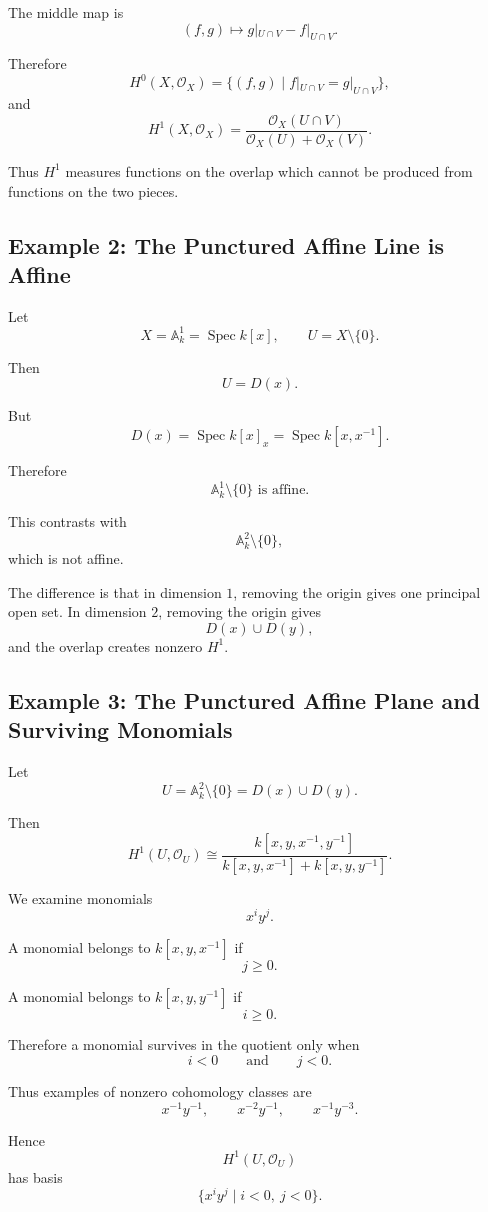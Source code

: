\documentclass[12pt,a4paper]{article}
\theoremstyle{notespace}
\begin{document}
The middle map is
\[
(f,g)
\longmapsto
g|_{U\cap V}-f|_{U\cap V}.
\]

Therefore
\[
H^0(X,\mathcal O_X)
=
\{(f,g)\mid f|_{U\cap V}=g|_{U\cap V}\},
\]
and
\[
H^1(X,\mathcal O_X)
=
\frac{\mathcal O_X(U\cap V)}
{\mathcal O_X(U)+\mathcal O_X(V)}.
\]

Thus $H^1$ measures functions on the overlap which cannot be produced from
functions on the two pieces.

\subsection{Example 2: The Punctured Affine Line is Affine}

Let
\[
X=\mathbb A_k^1=\operatorname{Spec}k[x],
\qquad
U=X\setminus\{0\}.
\]

Then
\[
U=D(x).
\]

But
\[
D(x)=\operatorname{Spec}k[x]_x
=
\operatorname{Spec}k[x,x^{-1}].
\]

Therefore
\[
\boxed{
	\mathbb A_k^1\setminus\{0\}
	\text{ is affine.}
}
\]

This contrasts with
\[
\mathbb A_k^2\setminus\{0\},
\]
which is not affine.

The difference is that in dimension $1$, removing the origin gives one
principal open set. In dimension $2$, removing the origin gives
\[
D(x)\cup D(y),
\]
and the overlap creates nonzero $H^1$.

\subsection{Example 3: The Punctured Affine Plane and Surviving Monomials}

Let
\[
U=\mathbb A_k^2\setminus\{0\}=D(x)\cup D(y).
\]

Then
\[
H^1(U,\mathcal O_U)
\cong
\frac{k[x,y,x^{-1},y^{-1}]}
{k[x,y,x^{-1}]+k[x,y,y^{-1}]}.
\]

We examine monomials
\[
x^iy^j.
\]

A monomial belongs to $k[x,y,x^{-1}]$ if
\[
j\geq0.
\]

A monomial belongs to $k[x,y,y^{-1}]$ if
\[
i\geq0.
\]

Therefore a monomial survives in the quotient only when
\[
i<0
\qquad\text{and}\qquad
j<0.
\]

Thus examples of nonzero cohomology classes are
\[
x^{-1}y^{-1},
\qquad
x^{-2}y^{-1},
\qquad
x^{-1}y^{-3}.
\]

Hence
\[
H^1(U,\mathcal O_U)
\]
has basis
\[
\{x^iy^j\mid i<0,\ j<0\}.
\]
\end{document}
